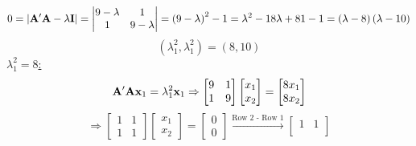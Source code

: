 \begin{enumerate}[font=\bfseries]
\begin{enumerate}
            \[
                0 = \left|\bold{A}^\prime\bold{A} - \lambda\bold{I}\right|
                =
                \left|
                \begin{matrix}
                    9 - \lambda & 1 \\
                    1 & 9 - \lambda
                \end{matrix}
                \right|
                =
                {\left(9 - \lambda\right)}^2 - 1
                =
                \lambda^2 - 18\lambda + 81 - 1
                = \left(\lambda - 8\right)\left(\lambda - 10\right)
            \]
            \[
                \left(\lambda_1^2, \lambda_1^2\right)
                =
                \left(8, 10\right)
            \]
            \underline{$\lambda_1^2 = 8$:}
            \[
                \bold{A}^\prime\bold{A}\bold{x}_1=\lambda_1^2\bold{x}_1
                \Rightarrow
                \begin{bmatrix}
                    9 & 1 \\
                    1 & 9
                \end{bmatrix}
                \begin{bmatrix}
                    x_1 \\
                    x_2
                \end{bmatrix}
                =
                \begin{bmatrix}
                    8x_1 \\
                    8x_2
                \end{bmatrix}
            \]
            \[
                \Rightarrow
                \begin{bmatrix}
                    1 & 1 \\
                    1 & 1
                \end{bmatrix}
                \begin{bmatrix}
                    x_1 \\
                    x_2
                \end{bmatrix}
                =
                \begin{bmatrix}
                    0 \\
                    0
                \end{bmatrix}
                \overset{\text{Row 2 - Row 1}}{\longrightarrow}
                \begin{bmatrix}
                    1 & 1 \\

\end{bmatrix}\]
\end{enumerate}
\end{enumerate}
